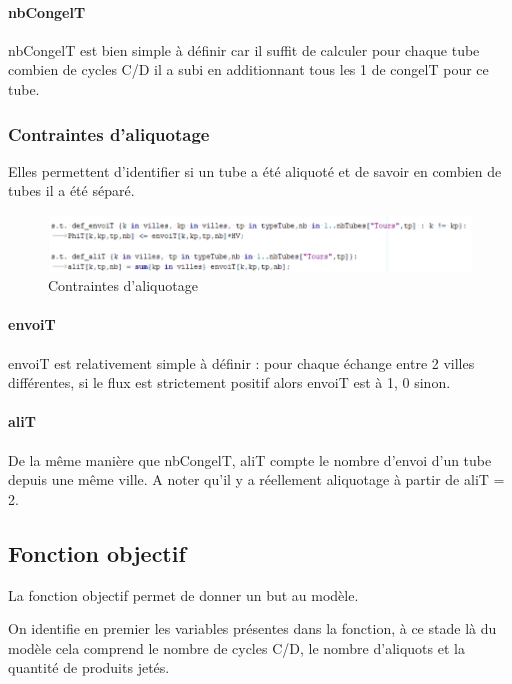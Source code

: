 \documentclass{polytech/polytech}
\numberwithin{figure}{chapter}
\begin{document}
\paragraph{nbCongelT}

nbCongelT est bien simple à définir car il suffit de calculer pour chaque tube combien de cycles C/D il a subi en additionnant tous les 1 de congelT pour ce tube.

\subsubsection{Contraintes d'aliquotage}

Elles permettent d'identifier si un tube a été aliquoté et de savoir en combien de tubes il a été séparé.
\begin{figure}[ht]
    \centering
    \includegraphics[width=\textwidth]{pic/aliquotage.png}
    \caption{Contraintes d'aliquotage}
\end{figure}

\paragraph{envoiT}

envoiT est relativement simple à définir : pour chaque échange entre 2 villes différentes, si le flux est strictement positif alors envoiT est à 1, 0 sinon.

\paragraph{aliT}

De la même manière que nbCongelT, aliT compte le nombre d'envoi d'un tube depuis une même ville. A noter qu'il y a réellement \gls{aliquotage} à partir de aliT = 2.
\pagebreak

\subsection{Fonction objectif}

La fonction objectif permet de donner un but au modèle.

On identifie en premier les variables présentes dans la fonction, à ce stade là du modèle cela comprend le nombre de cycles C/D, le nombre d'aliquots et la quantité de produits jetés.
\end{document}
